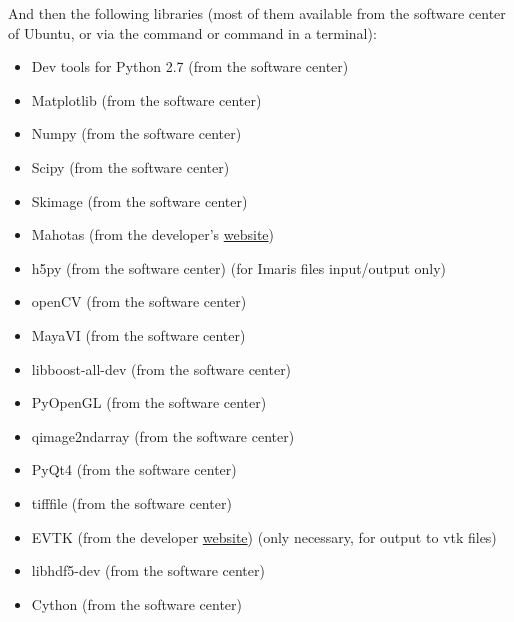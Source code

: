 \documentclass[letterpaper,10pt,english]{sphinxmanual}
\begin{document}
And then the following libraries (most of them available from the software center of Ubuntu, or via the  command or  command in a terminal):
\begin{itemize}
\item {} 
Dev tools for Python 2.7 (from the software center)

\item {} 
Matplotlib (from the software center)

\item {} 
Numpy (from the software center)

\item {} 
Scipy (from the software center)

\item {} 
Skimage (from the software center)

\item {} 
Mahotas (from the developer’s \href{http://luispedro.org/software/mahotas/}{website})

\item {} 
h5py (from the software center) (for Imaris files input/output only)

\item {} 
openCV (from the software center)

\item {} 
MayaVI (from the software center)

\item {} 
libboost-all-dev (from the software center)

\item {} 
PyOpenGL (from the software center)

\item {} 
qimage2ndarray (from the software center)

\item {} 
PyQt4 (from the software center)

\item {} 
tifffile (from the software center)

\item {} 
EVTK (from the developer \href{https://bitbucket.org/pauloh/pyevtk/overview}{website}) (only necessary, for output to vtk files)

\item {} 
libhdf5-dev (from the software center)

\item {} 
Cython (from the software center)

\end{itemize}
\end{document}
